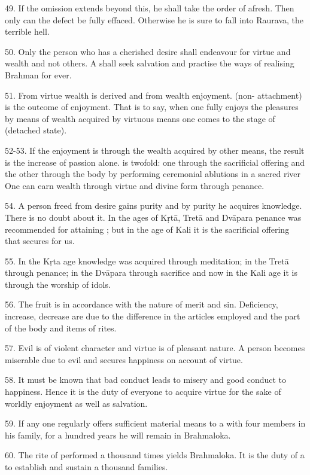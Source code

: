 49. If the omission extends beyond this, he shall take the order of 
afresh. Then only can the defect be fully effaced. Otherwise he is sure to fall
into Raurava, the terrible hell.

50. Only the person who has a cherished desire shall endeavour for virtue and
wealth and not others. A  shall seek salvation and practise
the ways of realising Brahman for ever.

51. From virtue wealth is derived and from wealth enjoyment.  (non-
attachment) is the outcome of enjoyment. That is to say, when one fully enjoys
the pleasures by means of wealth acquired by virtuous means one comes to
the stage of  (detached state).

52-53. If the enjoyment is through the wealth acquired by other means,
the result is the increase of passion alone.  is twofold: one through
the sacrificial offering and the other through the body by performing ceremonial
ablutions in a sacred river \etc One can earn wealth through virtue and divine
form through penance.

54. A person freed from desire gains purity and by purity he acquires knowledge.
There is no doubt about it. In the ages of Kṛtā, Tretā and Dvāpara penance was
recommended for attaining ; but in the age of Kali it is
the sacrificial offering that secures  for us.

55. In the Kṛta age knowledge was acquired through meditation; in the Tretā
through penance; in the Dvāpara through sacrifice and now in the Kali age it is
through the worship of idols.

56. The fruit is in accordance with the nature of merit and sin. Deficiency,
increase, decrease \etc are due to the difference in the articles employed and
the part of the body and items of rites.

57. Evil is of violent character and virtue is of pleasant nature. A person
becomes miserable due to evil and secures happiness on account of virtue.

58. It must be known that bad conduct leads to misery and good conduct to
happiness. Hence it is the duty of everyone to acquire virtue for the sake of
worldly enjoyment as well as salvation.

59. If any one regularly offers sufficient material means to a 
with four members in his family, for a hundred years he will remain in
Brahmaloka.

60. The rite of  performed a thousand times yields Brahmaloka. It
is the duty of a  to establish and sustain a thousand families.

